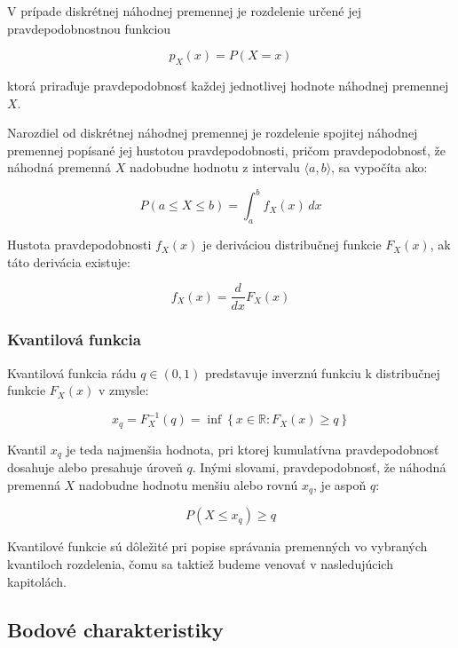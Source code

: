 V prípade diskrétnej náhodnej premennej je rozdelenie určené jej pravdepodobnostnou funkciou 

\begin{equation} 
p_X(x) = P(X = x) 
\end{equation} 

ktorá priraďuje pravdepodobnosť každej jednotlivej hodnote náhodnej premennej $X$.

Narozdiel od diskrétnej náhodnej premennej je rozdelenie spojitej náhodnej premennej popísané jej hustotou pravdepodobnosti, pričom pravdepodobnosť, že náhodná premenná $X$ nadobudne hodnotu z intervalu $\langle a, b \rangle$, sa vypočíta ako: 

\begin{equation}
P(a \leq X \leq b) = \int_{a}^{b} f_X(x) \, dx 
\end{equation}

Hustota pravdepodobnosti $f_X(x)$ je deriváciou distribučnej funkcie $F_X(x)$, ak táto derivácia existuje: 

\begin{equation} 
f_X(x) = \frac{d}{dx} F_X(x) 
\end{equation}

\subsubsection{Kvantilová funkcia}

Kvantilová funkcia rádu $q \in (0, 1)$ predstavuje inverznú funkciu k distribučnej funkcie $F_X(x)$ v zmysle:

\begin{equation}
x_q = F_X^{-1}(q) = \inf \left\{ x \in \mathbb{R} : F_X(x) \geq q \right\}
\end{equation}

Kvantil $x_q$ je teda najmenšia hodnota, pri ktorej kumulatívna pravdepodobnosť dosahuje alebo presahuje úroveň $q$. Inými slovami, pravdepodobnosť, že náhodná premenná $X$ nadobudne hodnotu menšiu alebo rovnú $x_q$, je aspoň $q$:

\begin{equation}
P(X \leq x_q) \geq q
\end{equation}

Kvantilové funkcie sú dôležité pri popise správania premenných vo vybraných kvantiloch rozdelenia, čomu sa taktiež budeme venovať v nasledujúcich kapitolách.

\subsection{Bodové charakteristiky}\label{subsec:bodove_charakteristiky}

